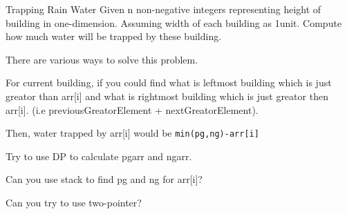\begin{problem}{Trapping Rain Water}
    Given n non-negative integers representing height of building in one-dimension. Assuming width of each building as 1unit. Compute how much water will be trapped by these building.

\end{problem}

\begin{solution}
    There are various ways to solve this problem.

    \begin{guide}

        \item For current building, if you could find what is leftmost building which is just greator than arr[i] and what is rightmost building which is just greator then arr[i]. (i.e previousGreatorElement + nextGreatorElement).
        
        Then, water trapped by arr[i] would be \verb|min(pg,ng)-arr[i]|

        Try to use DP to calculate pgarr and ngarr.

        \item Can you use stack to find pg and ng for arr[i]?
        
        \item Can you try to use two-pointer?
    \end{guide}

\end{solution}


